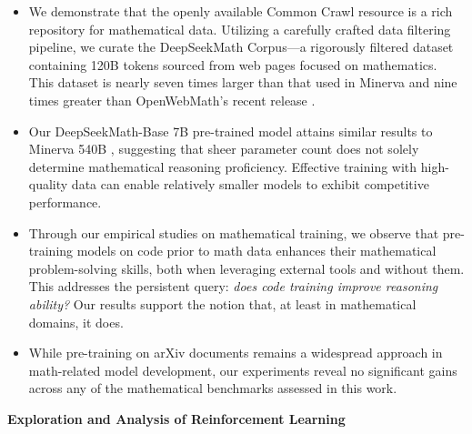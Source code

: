 \begin{itemize}[topsep=0pt]
    \item We demonstrate that the openly available Common Crawl resource is a rich repository for mathematical data. Utilizing a carefully crafted data filtering pipeline, we curate the DeepSeekMath Corpus—a rigorously filtered dataset containing 120B tokens sourced from web pages focused on mathematics. This dataset is nearly seven times larger than that used in Minerva \citep{minerva} and nine times greater than OpenWebMath's recent release \citep{openwebmath}.

    \item Our DeepSeekMath-Base 7B pre-trained model attains similar results to Minerva 540B \citep{minerva}, suggesting that sheer parameter count does not solely determine mathematical reasoning proficiency. Effective training with high-quality data can enable relatively smaller models to exhibit competitive performance.

    \item Through our empirical studies on mathematical training, we observe that pre-training models on code prior to math data enhances their mathematical problem-solving skills, both when leveraging external tools and without them. This addresses the persistent query: \textit{does code training improve reasoning ability?} Our results support the notion that, at least in mathematical domains, it does.

    \item While pre-training on arXiv documents remains a widespread approach in math-related model development, our experiments reveal no significant gains across any of the mathematical benchmarks assessed in this work.
\end{itemize}

\textbf{Exploration and Analysis of Reinforcement Learning}

